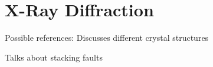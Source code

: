 \chapter{X-Ray Diffraction}

Possible references:
Discusses different crystal structures

Talks about stacking faults